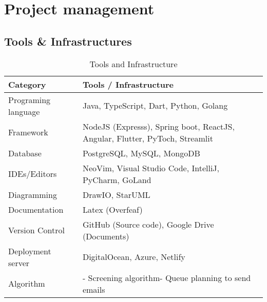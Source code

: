 \part{Project management}







\chapter{Tools \& Infrastructures}
\begin{table}[ht]
    \centering
    \begin{tabularx}{\textwidth}{|l|X|}
        \hline
        \textbf{Category} & \textbf{Tools / Infrastructure} \\ \hline
        Programing language & Java, TypeScript, Dart, Python, Golang \\ \hline
        Framework & NodeJS (Expresss), Spring boot, ReactJS, Angular, Flutter, PyToch, Streamlit\\ \hline
        Database & PostgreSQL, MySQL, MongoDB \\ \hline
        IDEs/Editors & NeoVim, Visual Studio Code, IntelliJ, PyCharm, GoLand \\ \hline
        Diagramming & DrawIO, StarUML \\ \hline
        Documentation & Latex (Overfeaf) \\ \hline
        Version Control & GitHub (Source code), Google Drive (Documents) \\ \hline
        Deployment server & DigitalOcean, Azure, Netlify \\ \hline
       
        Algorithm & - Screening algorithm\n- Queue planning to send emails \\ \hline
    \end{tabularx}
    \caption{Tools and Infrastructure}
    \label{tab:tools-infrastructure}
\end{table}